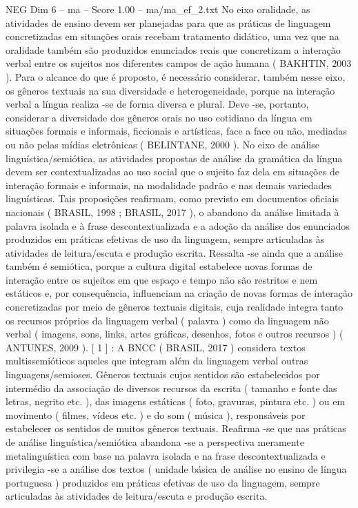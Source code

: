 \begin{textsample}{NEG Dim 6 – ma – Score 1.00 – ma/ma\_ef\_2.txt}
No eixo oralidade, as atividades de ensino devem ser planejadas para que as práticas de linguagem concretizadas em situações orais recebam tratamento didático, uma vez que na oralidade também são produzidos enunciados reais que concretizam a interação verbal entre os sujeitos nos diferentes campos de ação humana ( BAKHTIN, 2003 ).
Para o alcance do que é proposto, é necessário considerar, também nesse eixo, os gêneros textuais na sua diversidade e heterogeneidade, porque na interação verbal a língua realiza -se de forma diversa e plural.
Deve -se, portanto, considerar a diversidade dos gêneros orais no uso cotidiano da língua em situações formais e informais, ficcionais e artísticas, face a face ou não, mediadas ou não pelas mídias eletrônicas ( BELINTANE, 2000 ).
No eixo de análise linguística/semiótica, as atividades propostas de análise da gramática da língua devem ser contextualizadas ao uso social que o sujeito faz dela em situações de interação formais e informais, na modalidade padrão e nas demais variedades linguísticas.
Tais proposições reafirmam, como previsto em documentos oficiais nacionais ( BRASIL, 1998 ; BRASIL, 2017 ), o abandono da análise limitada à palavra isolada e à frase descontextualizada e a adoção da análise dos enunciados produzidos em práticas efetivas de uso da linguagem, sempre articuladas às atividades de leitura/escuta e produção escrita.
Ressalta -se ainda que a análise também é semiótica, porque a cultura digital estabelece novas formas de interação entre os sujeitos em que espaço e tempo não são restritos e nem estáticos e, por consequência, influenciam na criação de novas formas de interação concretizadas por meio de gêneros textuais digitais, cuja realidade integra tanto os recursos próprios da linguagem verbal ( palavra ) como da linguagem não verbal ( imagens, sons, links, artes gráficas, desenhos, fotos e outros recursos ) ( ANTUNES, 2009 ). [ 1 ] : A BNCC ( BRASIL, 2017 ) considera textos multissemióticos aqueles que integram além da linguagem verbal outras linguagens/semioses.
Gêneros textuais cujos sentidos são estabelecidos por intermédio da associação de diversos recursos da escrita ( tamanho e fonte das letras, negrito etc. ), das imagens estáticas ( foto, gravuras, pintura etc. ) ou em movimento ( filmes, vídeos etc. ) e do som ( música ), responsáveis por estabelecer os sentidos de muitos gêneros textuais.
Reafirma -se que nas práticas de análise linguística/semiótica abandona -se a perspectiva meramente metalinguística com base na palavra isolada e na frase descontextualizada e privilegia -se a análise dos textos ( unidade básica de análise no ensino de língua portuguesa ) produzidos em práticas efetivas de uso da linguagem, sempre articuladas às atividades de leitura/escuta e produção escrita.

\end{textsample}

